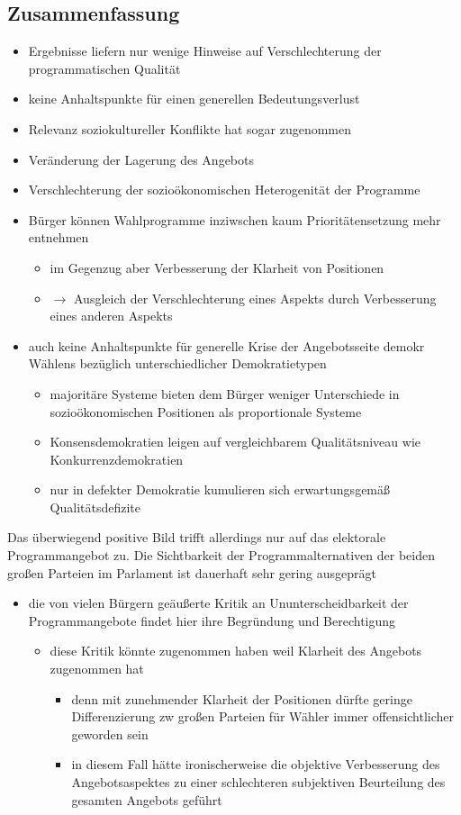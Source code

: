 \documentclass[11pt]{article}
\begin{document}
\subsection{Zusammenfassung}
\label{sec:orgb21b92c}
\begin{itemize}
\item Ergebnisse liefern nur wenige Hinweise auf Verschlechterung der programmatischen Qualität
\item keine Anhaltspunkte für einen generellen Bedeutungsverlust
\item Relevanz soziokultureller Konflikte hat sogar zugenommen
\item Veränderung der Lagerung des Angebots
\item Verschlechterung der sozioökonomischen Heterogenität der Programme
\item Bürger können Wahlprogramme inziwschen kaum Prioritätensetzung mehr entnehmen
\begin{itemize}
\item im Gegenzug aber Verbesserung der Klarheit von Positionen
\item \(\rightarrow\) Ausgleich der Verschlechterung eines Aspekts durch Verbesserung eines anderen Aspekts
\end{itemize}
\item auch keine Anhaltspunkte für generelle Krise der Angebotsseite demokr Wählens bezüglich unterschiedlicher Demokratietypen
\begin{itemize}
\item majoritäre Systeme bieten dem Bürger weniger Unterschiede in sozioökonomischen Positionen als proportionale Systeme
\item Konsensdemokratien leigen auf vergleichbarem Qualitätsniveau wie Konkurrenzdemokratien
\item nur in defekter Demokratie kumulieren sich erwartungsgemäß Qualitätsdefizite
\end{itemize}
\end{itemize}

Das überwiegend positive Bild trifft allerdings nur auf das elektorale Programmangebot zu. Die Sichtbarkeit der Programmalternativen der beiden großen Parteien im Parlament ist dauerhaft sehr gering ausgeprägt
\begin{itemize}
\item die von vielen Bürgern geäußerte Kritik an Ununterscheidbarkeit der Programmangebote findet hier ihre Begründung und Berechtigung
\begin{itemize}
\item diese Kritik könnte zugenommen haben weil Klarheit des Angebots zugenommen hat
\begin{itemize}
\item denn mit zunehmender Klarheit der Positionen dürfte geringe Differenzierung zw großen Parteien für Wähler immer offensichtlicher geworden sein
\item in diesem Fall hätte ironischerweise die objektive Verbesserung des Angebotsaspektes zu einer schlechteren subjektiven Beurteilung des gesamten Angebots geführt
\end{itemize}
\end{itemize}
\end{itemize}
\end{document}

